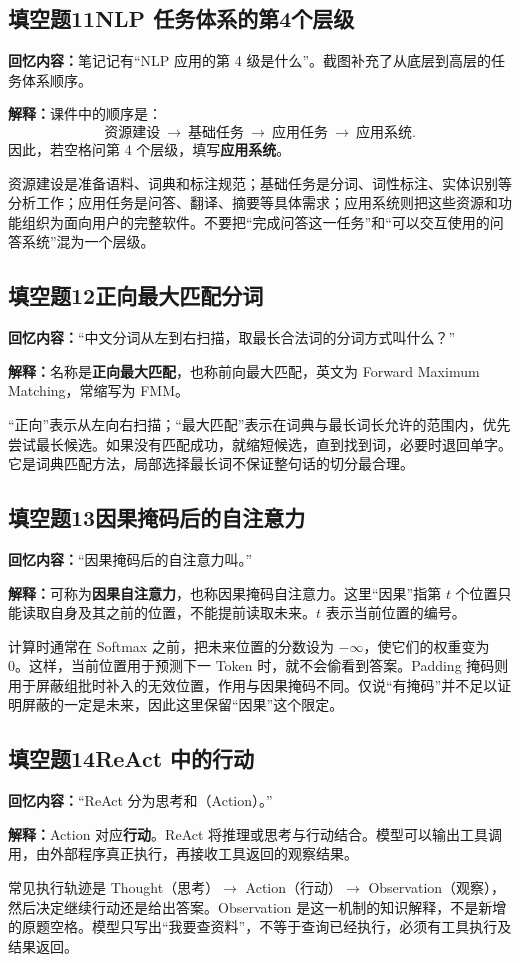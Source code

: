 \documentclass[UTF8,a4paper,zihao=-4,fontset=windows]{ctexart}
\newcommand{\recalled}[1]{\Needspace{8\baselineskip}\subsection*{#1}}
\begin{document}
\recalled{填空题11\quad NLP 任务体系的第4个层级}
\textbf{回忆内容：}笔记记有“NLP 应用的第 4 级是什么”。截图补充了从底层到高层的任务体系顺序。

\textbf{解释：}课件中的顺序是：
\[
\text{资源建设}\ \longrightarrow\ \text{基础任务}\ \longrightarrow\ \text{应用任务}\ \longrightarrow\ \text{应用系统}.
\]
因此，若空格问第 4 个层级，填写\textbf{应用系统}。

资源建设是准备语料、词典和标注规范；基础任务是分词、词性标注、实体识别等分析工作；应用任务是问答、翻译、摘要等具体需求；应用系统则把这些资源和功能组织为面向用户的完整软件。不要把“完成问答这一任务”和“可以交互使用的问答系统”混为一个层级。

\recalled{填空题12\quad 正向最大匹配分词}
\textbf{回忆内容：}“中文分词从左到右扫描，取最长合法词的分词方式叫什么？”

\textbf{解释：}名称是\textbf{正向最大匹配}，也称前向最大匹配，英文为 Forward Maximum Matching，常缩写为 FMM。

“正向”表示从左向右扫描；“最大匹配”表示在词典与最长词长允许的范围内，优先尝试最长候选。如果没有匹配成功，就缩短候选，直到找到词，必要时退回单字。它是词典匹配方法，局部选择最长词不保证整句话的切分最合理。

\recalled{填空题13\quad 因果掩码后的自注意力}
\textbf{回忆内容：}“因果掩码后的自注意力叫\underline{\hspace{1.5cm}}。”

\textbf{解释：}可称为\textbf{因果自注意力}，也称因果掩码自注意力。这里“因果”指第 $t$ 个位置只能读取自身及其之前的位置，不能提前读取未来。$t$ 表示当前位置的编号。

计算时通常在 Softmax 之前，把未来位置的分数设为 $-\infty$，使它们的权重变为 0。这样，当前位置用于预测下一 Token 时，就不会偷看到答案。Padding 掩码则用于屏蔽组批时补入的无效位置，作用与因果掩码不同。仅说“有掩码”并不足以证明屏蔽的一定是未来，因此这里保留“因果”这个限定。

\recalled{填空题14\quad ReAct 中的行动}
\textbf{回忆内容：}“ReAct 分为思考和\underline{\hspace{1.5cm}}（Action）。”

\textbf{解释：}Action 对应\textbf{行动}。ReAct 将推理或思考与行动结合。模型可以输出工具调用，由外部程序真正执行，再接收工具返回的观察结果。

常见执行轨迹是 Thought（思考）$\rightarrow$ Action（行动）$\rightarrow$ Observation（观察），然后决定继续行动还是给出答案。Observation 是这一机制的知识解释，不是新增的原题空格。模型只写出“我要查资料”，不等于查询已经执行，必须有工具执行及结果返回。
\end{document}
